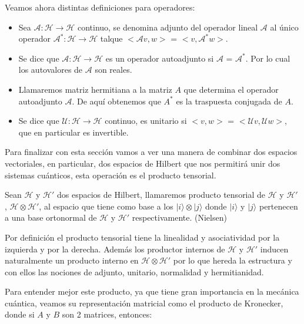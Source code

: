 \newpage

Veamos ahora distintas definiciones para operadores:
\begin{itemize}
    \item Sea $\mathscr{A}:\mathscr{H} \rightarrow \mathscr{H}$ continuo, se denomina adjunto del operador lineal $\mathscr{A}$ al único operador   $\mathscr{A}^{*}:\mathscr{H} \rightarrow \mathscr{H}$ talque $<\mathscr{A}v,w>$ = $<v,\mathscr{A}^{*}w>$.
    \item Se dice que $\mathscr{A}:\mathscr{H} \rightarrow \mathscr{H}$ es un operador autoadjunto si $\mathscr{A}$ = $\mathscr{A}^{*}$. Por lo cual los autovalores de $\mathscr{A}$ son reales.
    \item Llamaremos matriz hermitiana a la matriz $A$ que determina el operador autoadjunto $\mathscr{A}$. De aquí obtenemos que $A^{*}$ es la traspuesta conjugada de $A$.
    \item Se dice que $\mathscr{U}:\mathscr{H} \rightarrow \mathscr{H}$  continuo, es unitario si $<v,w>$ = $<\mathscr{U}v,\mathscr{U}w>$, que en particular es invertible.
\end{itemize}

\vspace{5pt}

Para finalizar con esta sección vamos a ver una manera de combinar dos espacios vectoriales, en particular, dos espacios de Hilbert que nos permitirá unir dos sistemas cuánticos, esta operación es el producto tensorial.

\vspace{5pt}

Sean $\mathscr{H}$ y $\mathscr{H}'$ dos espacios de Hilbert, llamaremos producto tensorial de $\mathscr{H}$ y $\mathscr{H}'$ , $\mathscr{H} \otimes \mathscr{H}'$, al espacio que tiene como base a los $|i\rangle \otimes |j\rangle$ donde $|i\rangle$ y $|j\rangle$ pertenecen a una base ortonormal de $\mathscr{H}$ y $\mathscr{H}'$ respectivamente. (Nielsen)

\vspace{5pt}
Por definición el producto tensorial tiene la linealidad y asociatividad por la izquierda y por la derecha. Además los productor internos de $\mathscr{H}$ y $\mathscr{H}'$ inducen naturalmente un producto interno en $\mathscr{H} \otimes \mathscr{H}'$ por lo que hereda la estructura y con ellos las nociones de adjunto, unitario, normalidad y hermitianidad.

\vspace{5pt}
Para entender mejor este producto, ya que tiene gran importancia en la mecánica cuántica, veamos su representación matricial como el producto de Kronecker, donde si $A$ y $B$ son 2 matrices, entonces:

